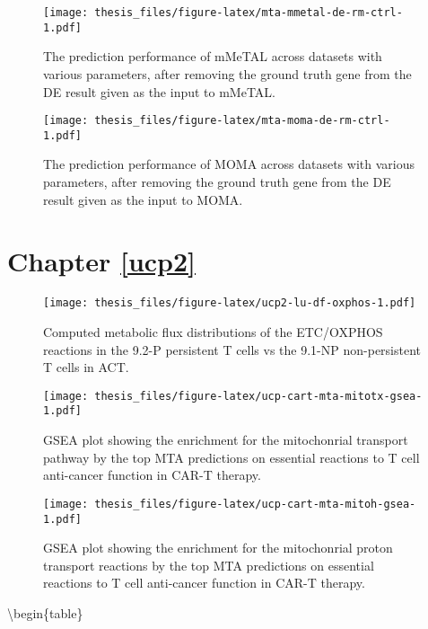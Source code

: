 \documentclass[12pt,twoside,openany,\mydriver]{thesis}  %
\begin{document}
\begin{figure}
\centering
\texttt{[image: thesis\_files/figure-latex/mta-mmetal-de-rm-ctrl-1.pdf]}
\caption{\label{fig:mta-mmetal-de-rm-ctrl}The prediction performance of mMeTAL across datasets with various parameters, after removing the ground truth gene from the DE result given as the input to mMeTAL.}
\end{figure}
\begin{figure}
\centering
\texttt{[image: thesis\_files/figure-latex/mta-moma-de-rm-ctrl-1.pdf]}
\caption{\label{fig:mta-moma-de-rm-ctrl}The prediction performance of MOMA across datasets with various parameters, after removing the ground truth gene from the DE result given as the input to MOMA.}
\end{figure}
\hypertarget{chapter-refucp2}{%
\section*{Chapter \ref{ucp2}}\label{chapter-refucp2}}
\begin{figure}
\centering
\texttt{[image: thesis\_files/figure-latex/ucp2-lu-df-oxphos-1.pdf]}
\caption{\label{fig:ucp2-lu-df-oxphos}Computed metabolic flux distributions of the ETC/OXPHOS reactions in the 9.2-P persistent T cells vs the 9.1-NP non-persistent T cells in ACT.}
\end{figure}
\begin{figure}
\centering
\texttt{[image: thesis\_files/figure-latex/ucp-cart-mta-mitotx-gsea-1.pdf]}
\caption{\label{fig:ucp-cart-mta-mitotx-gsea}GSEA plot showing the enrichment for the mitochonrial transport pathway by the top MTA predictions on essential reactions to T cell anti-cancer function in CAR-T therapy.}
\end{figure}
\begin{figure}
\centering
\texttt{[image: thesis\_files/figure-latex/ucp-cart-mta-mitoh-gsea-1.pdf]}
\caption{\label{fig:ucp-cart-mta-mitoh-gsea}GSEA plot showing the enrichment for the mitochonrial proton transport reactions by the top MTA predictions on essential reactions to T cell anti-cancer function in CAR-T therapy.}
\end{figure}
\textbackslash{}begin\{table\}
\end{document}
